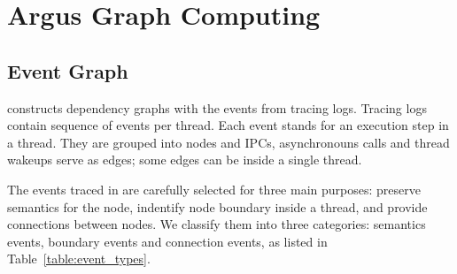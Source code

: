 \section{Argus Graph Computing}\label{sec:graphcomputing}

\subsection{Event Graph}\label{subsec:eventgraph}

\xxx constructs dependency graphs with the events from tracing logs. Tracing
logs contain sequence of events per thread. Each event stands for an execution
step in a thread. They are grouped into nodes and IPCs, asynchronouns calls
and thread wakeups serve as edges; some edges can be inside a single thread.

The events traced in \xxx are carefully selected for three main purposes:
preserve semantics for the node, indentify node boundary inside a thread, and
provide connections between nodes. We classify them into three categories:
semantics events, boundary events and connection events, as listed in
Table~\ref{table:event_types}.

